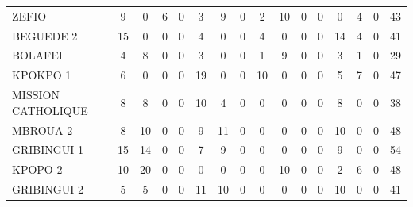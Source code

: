 {\begin{tabular}{l*{15}{c}}
ZEFIO       &              9&              0&              6&              0&              3&              9&              0&              2&             10&              0&              0&              0&              4&              0&             43\\
BEGUEDE   2 &             15&              0&              0&              0&              4&              0&              0&              4&              0&              0&              0&             14&              4&              0&             41\\
BOLAFEI     &              4&              8&              0&              0&              3&              0&              0&              1&              9&              0&              0&              3&              1&              0&             29\\
KPOKPO    1 &              6&              0&              0&              0&             19&              0&              0&             10&              0&              0&              0&              5&              7&              0&             47\\
MISSION  CATHOLIQUE&              8&              8&              0&              0&             10&              4&              0&              0&              0&              0&              0&              8&              0&              0&             38\\
MBROUA 2    &              8&             10&              0&              0&              9&             11&              0&              0&              0&              0&              0&             10&              0&              0&             48\\
GRIBINGUI 1 &             15&             14&              0&              0&              7&              9&              0&              0&              0&              0&              0&              9&              0&              0&             54\\
KPOPO 2     &             10&             20&              0&              0&              0&              0&              0&              0&             10&              0&              0&              2&              6&              0&             48\\
GRIBINGUI 2 &              5&              5&              0&              0&             11&             10&              0&              0&              0&              0&              0&             10&              0&              0&             41\\

\end{tabular}}
